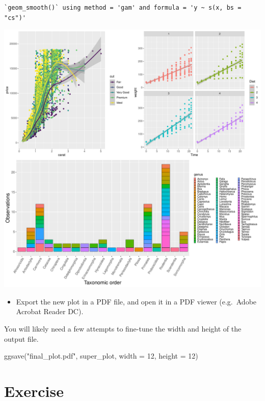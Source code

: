 \documentclass[
  letterpaper,
  DIV=11,
  numbers=noendperiod]{scrartcl}
\newenvironment{Shaded}{\begin{snugshade}}{\end{snugshade}}
\newcommand{\AttributeTok}[1]{\textcolor[rgb]{0.40,0.45,0.13}{#1}}
\newcommand{\DecValTok}[1]{\textcolor[rgb]{0.68,0.00,0.00}{#1}}
\newcommand{\FunctionTok}[1]{\textcolor[rgb]{0.28,0.35,0.67}{#1}}
\newcommand{\NormalTok}[1]{\textcolor[rgb]{0.00,0.23,0.31}{#1}}
\newcommand{\StringTok}[1]{\textcolor[rgb]{0.13,0.47,0.30}{#1}}
\providecommand{\tightlist}{%
  \setlength{\itemsep}{0pt}\setlength{\parskip}{0pt}}\usepackage{longtable,booktabs,array}
\begin{document}
\begin{verbatim}
`geom_smooth()` using method = 'gam' and formula = 'y ~ s(x, bs = "cs")'
\end{verbatim}

\includegraphics{5-ggplot2_kevin_files/figure-pdf/unnamed-chunk-27-1.pdf}

\begin{itemize}
\tightlist
\item
  Export the new plot in a PDF file, and open it in a PDF viewer
  (e.g.~Adobe Acrobat Reader DC).
\end{itemize}

You will likely need a few attempts to fine-tune the width and height of
the output file.

\begin{Shaded}
\begin{Highlighting}[]
\FunctionTok{ggsave}\NormalTok{(}\StringTok{"final\_plot.pdf"}\NormalTok{, super\_plot, }\AttributeTok{width =} \DecValTok{12}\NormalTok{, }\AttributeTok{height =} \DecValTok{12}\NormalTok{)}
\end{Highlighting}
\end{Shaded}

\section{Exercise}\label{exercise-5}
\end{document}

